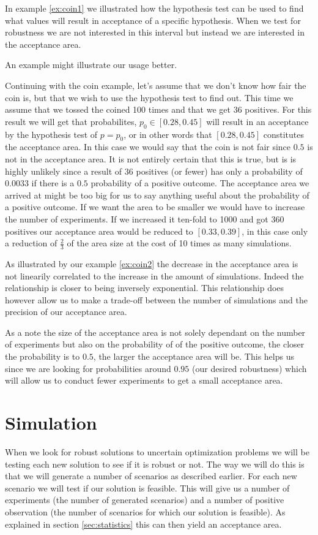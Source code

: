 In example \ref{ex:coin1} we illustrated how the hypothesis test can be
used to find what values will result in acceptance of a specific
hypothesis. When we test for robustness we are not interested in this
interval but instead we are interested in the acceptance area. 

An example might illustrate our usage better.
\begin{example}
\label{ex:coin2}
Continuing with the coin example, let's assume that we don't know how
fair the coin is, but that we wish to use the hypothesis test to find
out. This time we assume that we tossed the coined 100 times and that
we get 36 positives. For this result we will get that probabilites,
$p_0 \in [0.28,0.45]$ will result in an acceptance by the hypothesis test
of $p=p_0$, or in other words that $[0.28,0.45]$ constitutes the
acceptance area. In this case we would say that the coin is not fair since
$0.5$ is not in the acceptance area. It is not entirely certain that this
is true, but is is highly unlikely since a result of 36 positives (or
fewer) has only a probability of $0.0033$ if there is a $0.5$
probability of a positive outcome. The acceptance area we arrived at
might be too big for us to say anything useful about the probability of a positive
outcome. If we want the area
to be smaller we would have to increase the number of experiments. If
we increased it ten-fold to 1000 and got 360 positives our acceptance area
would be reduced to $[0.33,0.39]$, in this case only a reduction of
$\frac23$ of the area size at the cost of 10 times as many simulations.
\end{example}

As illustrated by our example \ref{ex:coin2} the decrease in the acceptance
area is not linearily correlated to the increase in the amount of
simulations. Indeed the relationship is closer to being inversely
exponential. This relationship does however allow us to make a
trade-off between the number of simulations and the precision of our
acceptance area. 

As a note the size of the acceptance area is not solely dependant on
the number of experiments but also on the probability of of the
positive outcome, the closer the probability is to $0.5$, the larger
the acceptance area will be. This helps us since we are looking for
probabilities around $0.95$ (our desired robustness) which will allow
us to conduct fewer experiments to get a small acceptance area.


\section{Simulation}
\label{sec:simulation}
When we look for robust solutions to uncertain optimization problems
we will be testing each new solution to see if it is robust or
not. The way we will do this is that we will generate a number of
scenarios as described earlier. For each new scenario we will test if
our solution is feasible. This will give us a number of experiments
(the number of generated scenarios) and a number of positive
observation (the number of scenarios for which our solution
is feasible). As explained in section \ref{sec:statistics} this can
then yield an acceptance area.

